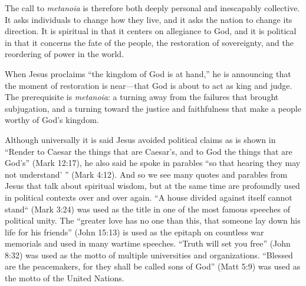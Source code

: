 The call to \textit{metanoia} is therefore both deeply personal and inescapably collective.
It asks individuals to change how they live, and it asks the nation to change its direction.
It is spiritual in that it centers on allegiance to God, and it is political in that it concerns the fate of the people, the restoration of sovereignty, and the reordering of power in the world.

When Jesus proclaims ``the kingdom of God is at hand,'' he is announcing that the moment of restoration is near---that God is about to act as king and judge.
The prerequisite is \textit{metanoia}: a turning away from the failures that brought subjugation, and a turning toward the justice and faithfulness that make a people worthy of God's kingdom.

Although universally it is said Jesus avoided political claims as is shown in ``Render to Caesar the things that are Caesar's, and to God the things that are God's'' (Mark 12:17), he also said he spoke in parables ``so that hearing they may not understand' '' (Mark 4:12).
And so we see many quotes and parables from Jesus that talk about spiritual wisdom, but at the same time are profoundly used in political contexts over and over again.
``A house divided against itself cannot stand`` (Mark 3:24) was used as the title in one of the most famous speeches of political unity.
The ``greater love has no one than this, that someone lay down his life for his friends'' (John 15:13) is used as the epitaph on countless war memorials and used in many wartime speeches.
``Truth will set you free'' (John 8:32) was used as the motto of multiple universities and organizations.
``Blessed are the peacemakers, for they shall be called sons of God'' (Matt 5:9) was used as the motto of the United Nations.

